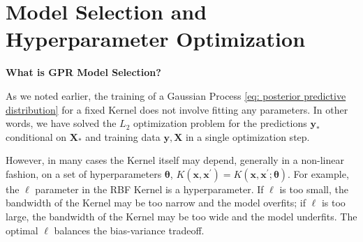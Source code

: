 \documentclass[11pt]{article}
\theoremstyle{plain} %
\theoremstyle{remark}
\begin{document}
\section{Model Selection and Hyperparameter Optimization}

\textbf{What is GPR Model Selection?}

As we noted earlier, the training of a Gaussian Process \cref{eq: posterior predictive distribution} for a fixed Kernel
does not involve fitting any parameters. In other words, we have solved the
$L_{2}$ optimization problem for the predictions $\mathbf{y}_{*}$ conditional on
$\mathbf{X}_{*}$ and training data $\mathbf{y}, \mathbf{X}$ in a single
optimization step.

However, in many cases the Kernel itself may depend, generally in a non-linear
fashion, on a set of hyperparameters $\boldsymbol{\theta}$, $K\left(\mathbf{x},
  \mathbf{x}^{\prime}\right)=K\left(\mathbf{x}, \mathbf{x}^{\prime};
  \boldsymbol{\theta}\right)$. For example, the $\ell$ parameter in the RBF Kernel is a
hyperparameter. If $\ell$ is too small, the bandwidth of the Kernel may be too narrow and the
model overfits; if $\ell$ is too large, the bandwidth of the Kernel may be too wide and the
model underfits. The optimal $\ell$ balances the bias-variance tradeoff.
\end{document}
